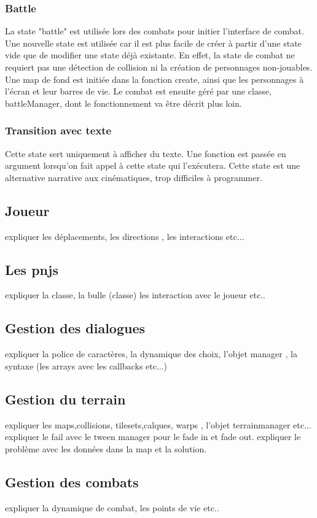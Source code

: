 \documentclass[11pt]{article}
\begin{document}
\subsubsection{Battle}
La state "battle" est utilisée lors des combats pour initier l'interface de combat. Une nouvelle state est utilisée car il est plus facile de créer à partir d'une state vide que de modifier une state déjà existante. En effet, la state de combat ne requiert pas une détection de collision ni la création de personnages non-jouables.
\\ Une map de fond est initiée dans la fonction create, ainsi que les personnages à l'écran et leur barres de vie. Le combat est ensuite géré par une classe, battleManager, dont le fonctionnement va être décrit plus loin.
\subsubsection{Transition avec texte}
Cette state sert uniquement à afficher du texte. Une fonction est passée en argument lorsqu'on fait appel à cette state qui l'exécutera. Cette state est une alternative narrative aux cinématiques, trop difficiles à programmer.  
\subsection{Joueur}
expliquer les déplacements, les directions , les interactions etc...
\subsection{Les pnjs}
expliquer la classe, la bulle (classe) 
les interaction avec le joueur etc..
\subsection{Gestion des dialogues}
expliquer la police de caractères, la dynamique des choix, l'objet manager , la syntaxe (les arrays avec les callbacks etc...)
\subsection{Gestion du terrain}
expliquer les maps,collisions, tilesets,calques, warps , l'objet terrainmanager etc... expliquer le fail avec le tween manager pour le fade in et fade out.
expliquer le problème avec les données dans la map et la solution.
\subsection{Gestion des combats}
expliquer la dynamique de combat, les points de vie etc..
\end{document}
